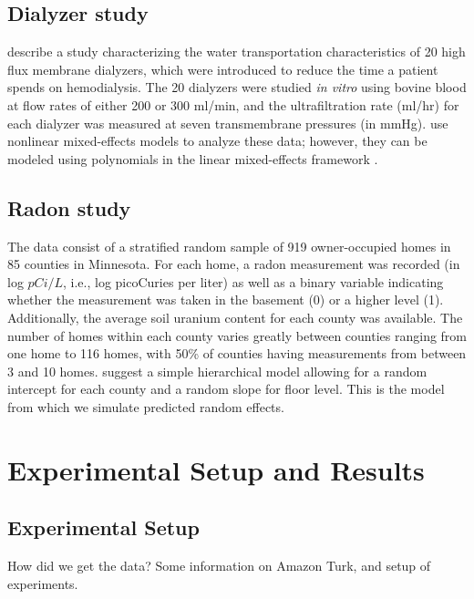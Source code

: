 \documentclass[12pt]{article} %
\begin{document}
\subsection{Dialyzer study}\label{data:dialyzer}

\cite{Vonesh:1992us} describe a study characterizing the water transportation characteristics of 20 high flux membrane dialyzers, which were introduced to reduce the time a patient spends on hemodialysis. The 20 dialyzers were studied \emph{in vitro} using bovine blood at flow rates of either 200 or 300 ml/min, and the ultrafiltration rate (ml/hr) for each dialyzer was measured at seven transmembrane pressures (in mmHg). \cite{Vonesh:1992us} use nonlinear mixed-effects models to analyze these data; however, they can be modeled using polynomials in the linear mixed-effects framework \citep[Section 9.5]{Littell:2006}.

\subsection{Radon study}\label{data:radon}

The data consist of a stratified random sample of 919 owner-occupied homes in 85 counties in Minnesota. For each home, a radon measurement was recorded (in log $pCi/L$, i.e., log picoCuries per liter) as well as a binary variable indicating whether the measurement was taken in the basement (0) or a higher level (1). Additionally, the average soil uranium content for each county was available. The number of homes within each county varies greatly between counties ranging from one home to 116 homes, with 50\% of counties having measurements from between 3 and 10 homes. \cite{Gelman:2006ue} suggest a simple hierarchical model allowing for a random intercept for each county and a random slope for floor level. This is the model from which we simulate predicted random effects.

\section{Experimental Setup and Results}\label{study}
\subsection{Experimental Setup}
How did we get the data? Some information on Amazon Turk, and setup of experiments.
\end{document}
